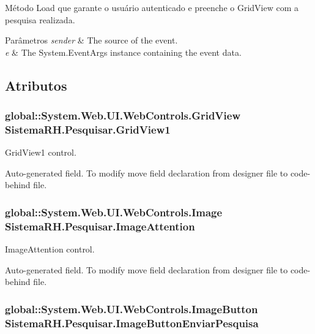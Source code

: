 Método Load que garante o usuário autenticado e preenche o GridView com a pesquisa realizada. 


\begin{DoxyParams}{Parâmetros}
{\em sender} & The source of the event.\\
\hline
{\em e} & The System.EventArgs instance containing the event data.\\
\hline
\end{DoxyParams}


\subsection{Atributos}
\hypertarget{class_sistema_r_h_1_1_pesquisar_a28919d9426169a099b8ea857b139ebfe}{
\subsubsection[{GridView1}]{\setlength{\rightskip}{0pt plus 5cm}global::System.Web.UI.WebControls.GridView {\bf SistemaRH.Pesquisar.GridView1}}}
\label{class_sistema_r_h_1_1_pesquisar_a28919d9426169a099b8ea857b139ebfe}


GridView1 control. 

Auto-\/generated field. To modify move field declaration from designer file to code-\/behind file. \hypertarget{class_sistema_r_h_1_1_pesquisar_a131eb4f5f365d86398a16541cfa83920}{
\subsubsection[{ImageAttention}]{\setlength{\rightskip}{0pt plus 5cm}global::System.Web.UI.WebControls.Image {\bf SistemaRH.Pesquisar.ImageAttention}}}
\label{class_sistema_r_h_1_1_pesquisar_a131eb4f5f365d86398a16541cfa83920}


ImageAttention control. 

Auto-\/generated field. To modify move field declaration from designer file to code-\/behind file. \hypertarget{class_sistema_r_h_1_1_pesquisar_ada5643710f0e8e14d2c54c7efeb968a1}{
\subsubsection[{ImageButtonEnviarPesquisa}]{\setlength{\rightskip}{0pt plus 5cm}global::System.Web.UI.WebControls.ImageButton {\bf SistemaRH.Pesquisar.ImageButtonEnviarPesquisa}}}
\label{class_sistema_r_h_1_1_pesquisar_ada5643710f0e8e14d2c54c7efeb968a1}



